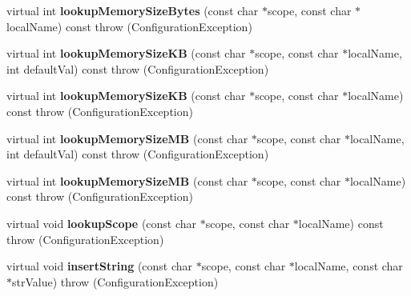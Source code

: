 \begin{DoxyCompactItemize}
\item 
\hypertarget{classCONFIG4CPP__NAMESPACE_1_1ConfigurationImpl_a017552e95bfc76327c312abdc5763d83}{virtual int {\bfseries lookup\-Memory\-Size\-Bytes} (const char $\ast$scope, const char $\ast$local\-Name) const   throw (\-Configuration\-Exception)}\label{classCONFIG4CPP__NAMESPACE_1_1ConfigurationImpl_a017552e95bfc76327c312abdc5763d83}

\item 
\hypertarget{classCONFIG4CPP__NAMESPACE_1_1ConfigurationImpl_ad2ac7343ea26a30e2d96814bffb0a487}{virtual int {\bfseries lookup\-Memory\-Size\-K\-B} (const char $\ast$scope, const char $\ast$local\-Name, int default\-Val) const   throw (\-Configuration\-Exception)}\label{classCONFIG4CPP__NAMESPACE_1_1ConfigurationImpl_ad2ac7343ea26a30e2d96814bffb0a487}

\item 
\hypertarget{classCONFIG4CPP__NAMESPACE_1_1ConfigurationImpl_a3588e172ebe97a68d6a7be152af1b1a7}{virtual int {\bfseries lookup\-Memory\-Size\-K\-B} (const char $\ast$scope, const char $\ast$local\-Name) const   throw (\-Configuration\-Exception)}\label{classCONFIG4CPP__NAMESPACE_1_1ConfigurationImpl_a3588e172ebe97a68d6a7be152af1b1a7}

\item 
\hypertarget{classCONFIG4CPP__NAMESPACE_1_1ConfigurationImpl_a712a5b369196e9e6bbe1cb37c32bdd05}{virtual int {\bfseries lookup\-Memory\-Size\-M\-B} (const char $\ast$scope, const char $\ast$local\-Name, int default\-Val) const   throw (\-Configuration\-Exception)}\label{classCONFIG4CPP__NAMESPACE_1_1ConfigurationImpl_a712a5b369196e9e6bbe1cb37c32bdd05}

\item 
\hypertarget{classCONFIG4CPP__NAMESPACE_1_1ConfigurationImpl_aace97afae1a72e359ad4cc4fc6f49c2b}{virtual int {\bfseries lookup\-Memory\-Size\-M\-B} (const char $\ast$scope, const char $\ast$local\-Name) const   throw (\-Configuration\-Exception)}\label{classCONFIG4CPP__NAMESPACE_1_1ConfigurationImpl_aace97afae1a72e359ad4cc4fc6f49c2b}

\item 
\hypertarget{classCONFIG4CPP__NAMESPACE_1_1ConfigurationImpl_a18321521841863698ac304cdc8726055}{virtual void {\bfseries lookup\-Scope} (const char $\ast$scope, const char $\ast$local\-Name) const   throw (\-Configuration\-Exception)}\label{classCONFIG4CPP__NAMESPACE_1_1ConfigurationImpl_a18321521841863698ac304cdc8726055}

\item 
\hypertarget{classCONFIG4CPP__NAMESPACE_1_1ConfigurationImpl_a8881068f2c34e58e31869e66e49c10d8}{virtual void {\bfseries insert\-String} (const char $\ast$scope, const char $\ast$local\-Name, const char $\ast$str\-Value)  throw (\-Configuration\-Exception)}\label{classCONFIG4CPP__NAMESPACE_1_1ConfigurationImpl_a8881068f2c34e58e31869e66e49c10d8}


\end{DoxyCompactItemize}
